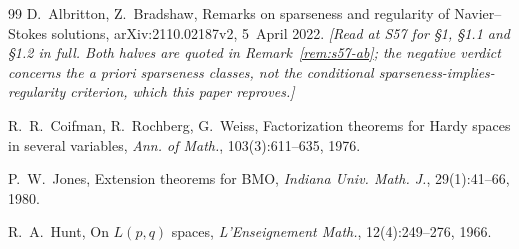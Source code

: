 \documentclass[11pt]{article}
\theoremstyle{definition}
\theoremstyle{remark}
\begin{document}
\begin{thebibliography}{99}
  D.~Albritton, Z.~Bradshaw,
  Remarks on sparseness and regularity of Navier--Stokes solutions,
  arXiv:2110.02187v2, 5~April 2022.
  \emph{[Read at S57 for \S1, \S1.1 and \S1.2 in full. Both halves are
  quoted in Remark~\ref{rem:s57-ab}; the negative verdict concerns the a
  priori sparseness classes, not the conditional sparseness-implies-regularity
  criterion, which this paper reproves.]}

  R.~R.~Coifman, R.~Rochberg, G.~Weiss,
  Factorization theorems for Hardy spaces in several variables,
  \emph{Ann. of Math.}, 103(3):611--635, 1976.

  P.~W.~Jones,
  Extension theorems for BMO,
  \emph{Indiana Univ. Math. J.}, 29(1):41--66, 1980.

  R.~A.~Hunt,
  On $L(p,q)$ spaces,
  \emph{L'Enseignement Math.}, 12(4):249--276, 1966.
\end{thebibliography}
\end{document}
